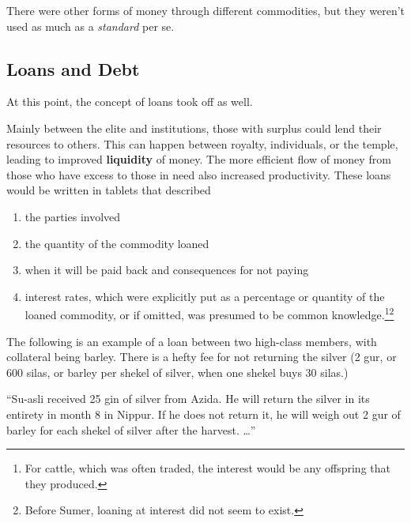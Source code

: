 \documentclass{article}
\begin{document}
    There were other forms of money through different commodities, but they weren't used as much as a \textit{standard} per se. 

  \subsection{Loans and Debt}

    At this point, the concept of loans took off as well.
    
    \begin{finance}
      Mainly between the elite and institutions, those with surplus could lend their resources to others. This can happen between royalty, individuals, or the temple, leading to improved \textbf{liquidity} of money. The more efficient flow of money from those who have excess to those in need also increased productivity. These loans would be written in tablets that described 
      \begin{enumerate}
        \item the parties involved 
        \item the quantity of the commodity loaned 
        \item when it will be paid back and consequences for not paying
        \item interest rates, which were explicitly put as a percentage or quantity of the loaned commodity, or if omitted, was presumed to be common knowledge.\footnote{For cattle, which was often traded, the interest would be any offspring that they produced. }\footnote{Before Sumer, loaning at interest did not seem to exist. }
      \end{enumerate}
    \end{finance}

    \begin{example}[Loan]
      The following is an example of a loan between two high-class members, with collateral being barley. There is a hefty fee for not returning the silver (2 gur, or 600 silas, or barley per shekel of silver, when one shekel buys 30 silas.)

      \begin{center}
        “Su-asli received 25 gin of silver from Azida. He will return the silver in its entirety in month 8 in Nippur. If he does not return it, he will weigh out 2 gur of barley for each shekel of silver after the harvest. …”
      \end{center}
    \end{example}
\end{document}
